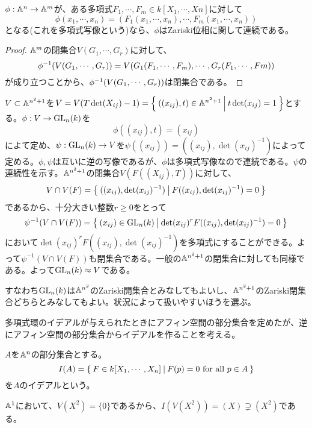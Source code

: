 \documentclass{ltjsreport}
\begin{document}
\begin{prop}\label{continuity}
  $\phi:\mathbb{A}^n\rightarrow \mathbb{A}^m$が、ある多項式$F_1,\cdots,F_m\in k[X_1,\cdots,Xn]$に対して
  \[
  \phi(x_1,\cdots,x_n)=(F_1(x_1,\cdots,x_n),\cdots,F_m(x_1,\cdots,x_n))  
  \]
  となる(これを多項式写像という)なら、$\phi$はZariski位相に関して連続である。
\end{prop}

\begin{proof}
  $\mathbb{A}^m$の閉集合$V(G_1,\cdots,G_r)$に対して、
  \[
  \phi^{-1}(V(G_1,\cdots,G_r))=V(G_1(F_1,\cdots,F_m),\cdots,G_r(F_1,\cdots,Fm))  
  \]
  が成り立つことから、$\phi^{-1}(V(G_1,\cdots,G_r))$は閉集合である。
\end{proof}

\begin{eg}\label{affine_gl_n}
  $V\subset\mathbb{A}^{n^2+1}$を$V=V(T\det(X_{ij})-1)=\left\{\:((x_{ij}),t)\in\mathbb{A}^{n^2+1}\:\middle|\:t\det(x_{ij})=1\:\right\}$とする。$\phi:V\rightarrow \text{GL}_n(k)$を
  \[
  \phi((x_{ij}),t)=(x_{ij})  
  \]
  によて定め、$\psi:\text{GL}_n(k)\rightarrow V$を$\psi((x_{ij}))=((x_{ij}),\det(x_{ij})^{-1})$によって定める。$\phi,\psi$は互いに逆の写像であるが、$\phi$は多項式写像なので連続である。$\psi$の連続性を示す。$\mathbb{A}^{n^2+1}$の閉集合$V(F((X_{ij}),T))$に対して、
  \[
  V\cap V(F)=\left\{\:((x_{ij}),\det(x_{ij})^{-1})\:\middle|\:F((x_{ij}),\det(x_{ij})^{-1})=0\:\right\}  
  \]
  であるから、十分大きい整数$r\geq 0$をとって
  \[
  \psi^{-1}(V\cap V(F))=\left\{\:(x_{ij})\in\text{GL}_n(k)\:\middle|\:\det(x_{ij})^rF((x_{ij}),\det(x_{ij})^{-1})=0\:\right\}  
  \]
  において$\det(x_{ij})^rF((x_{ij}),\det(x_{ij})^{-1})$を多項式にすることができる。よって$\psi^{-1}(V\cap V(F))$も閉集合である。一般の$\mathbb{A}^{n^2+1}$の閉集合に対しても同様である。よって$\text{GL}_n(k)\approx V$である。

  すなわち$\text{GL}_n(k)$は$\mathbb{A}^{n^2}$のZariski開集合とみなしてもよいし、$\mathbb{A}^{n^2+1}$のZariski閉集合どちらとみなしてもよい。状況によって扱いやすいほうを選ぶ。
\end{eg}




多項式環のイデアルが与えられたときにアフィン空間の部分集合を定めたが、逆にアフィン空間の部分集合からイデアルを作ることを考える。

\begin{defin}
  $A$を$\mathbb{A}^n$の部分集合とする。
  \[
  I(A)=\left\{\:F\in k[X_1,\cdots,X_n]\:\middle|\:F(p)=0 \text{ for all }p\in A\:\right\}
  \]
  を$A$のイデアルという。
\end{defin}

\begin{eg}
  $\mathbb{A}^1$において、$V(X^2)=\{0\}$であるから、$I(V(X^2))=(X)\supsetneq (X^2)$である。
\end{eg}
\end{document}

